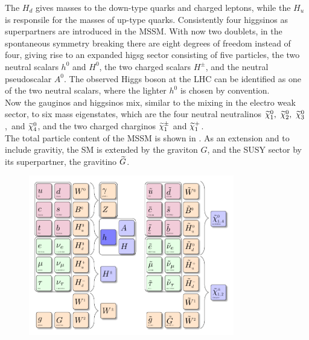 The $H_d$ gives masses to the down-type quarks and charged leptons, while the $H_u$ is responsile for the masses of up-type quarks. Consistently four higgsinos as superpartners are introduced in the MSSM. With now two doublets, in the spontaneous symmetry breaking there are eight degrees of freedom instead of four, giving rise to an expanded higsg sector consisting of five particles, the two neutral scalars $h^0$ and $H^0$, the two charged scalars $H^{\pm}$, and the neutral pseudoscalar $A^0$. The observed Higgs boson at the LHC can be identified as one of the two neutral scalars, where the lighter $h^0$ is chosen by convention.\\
Now the gauginos and higgsinos mix, similar to the mixing in the electro weak sector, to six mass eigenstates, which are the four neutral neutralinos $\widetilde{\chi}^{0}_{1},~\widetilde{\chi}^{0}_{2},~\widetilde{\chi}^{0}_{3}$,~and $\widetilde{\chi}^{0}_{4}$, and the two charged charginos $\widetilde{\chi}^\pm_{1}$ and $\widetilde{\chi}^{+}_{1}$.\\
The total particle content of the MSSM is shown in . As an extension and to include gravitiy, the SM is extended by the graviton $G$, and the SUSY sector by its superpartner, the gravitino $\widetilde{G}$.

\begin{figure}[!htpb]
\centering
  \includegraphics[width=0.8\textwidth]{figures/general/MSSM}
  \caption{}
  \label{fig:mssm}
\end{figure}

